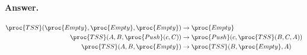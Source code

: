 \paragraph{Answer.} 
\begin{align}
\proc{TSS}(\proc{Empty}, \proc{Empty}, \proc{Empty}) &\rightarrow
\proc{Empty}\\
\proc{TSS}(A, B, \proc{Push}(c,C)) &\rightarrow \proc{Push}(c,
\proc{TSS}(B, C, A))\\
\proc{TSS}(A, B, \proc{Empty}) &\rightarrow \proc{TSS} (B,
\proc{Empty}, A)
\end{align}
